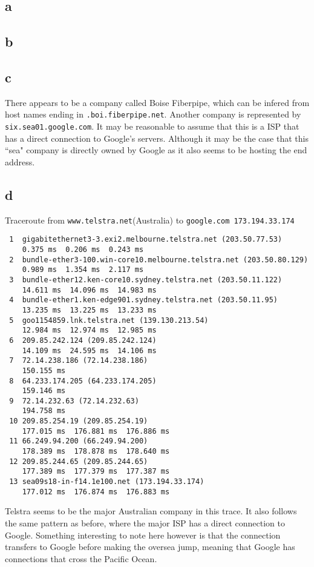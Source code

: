 \documentclass[12pt,letterpaper]{article}
\begin{document}
\subsection*{a}

\subsection*{b}

\subsection*{c}
There appears to be a company called Boise Fiberpipe, which can be infered from host names ending in \verb!.boi.fiberpipe.net!.
Another company is represented by \verb!six.sea01.google.com!.
It may be reasonable to assume that this is a ISP that has a direct connection to Google's servers.
Although it may be the case that this ``sea" company is directly owned by Google as it also seems to be hosting the end address.
\subsection*{d}
Traceroute from \verb!www.telstra.net!(Australia) to \verb!google.com 173.194.33.174!

\begin{verbatim}
 1  gigabitethernet3-3.exi2.melbourne.telstra.net (203.50.77.53)
    0.375 ms  0.206 ms  0.243 ms
 2  bundle-ether3-100.win-core10.melbourne.telstra.net (203.50.80.129)
    0.989 ms  1.354 ms  2.117 ms
 3  bundle-ether12.ken-core10.sydney.telstra.net (203.50.11.122)
    14.611 ms  14.096 ms  14.983 ms
 4  bundle-ether1.ken-edge901.sydney.telstra.net (203.50.11.95)
    13.235 ms  13.225 ms  13.233 ms
 5  goo1154859.lnk.telstra.net (139.130.213.54)
    12.984 ms  12.974 ms  12.985 ms
 6  209.85.242.124 (209.85.242.124)
    14.109 ms  24.595 ms  14.106 ms
 7  72.14.238.186 (72.14.238.186)
    150.155 ms
 8  64.233.174.205 (64.233.174.205)
    159.146 ms
 9  72.14.232.63 (72.14.232.63)
    194.758 ms
 10 209.85.254.19 (209.85.254.19)
    177.015 ms  176.881 ms  176.886 ms
 11 66.249.94.200 (66.249.94.200)
    178.389 ms  178.878 ms  178.640 ms
 12 209.85.244.65 (209.85.244.65)
    177.389 ms  177.379 ms  177.387 ms
 13 sea09s18-in-f14.1e100.net (173.194.33.174)
    177.012 ms  176.874 ms  176.883 ms
\end{verbatim}

Telstra seems to be the major Australian company in this trace.
It also follows the same pattern as before, where the major ISP has a direct connection to Google.
Something interesting to note here however is that the connection transfers to Google before making the oversea jump, meaning that Google has connections that cross the Pacific Ocean.
\end{document}
